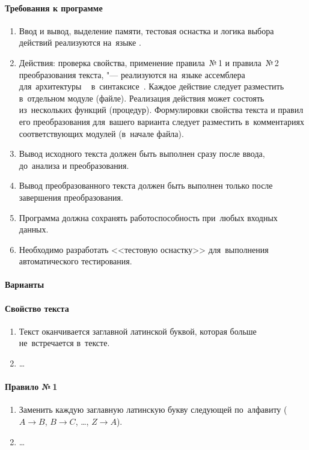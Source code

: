 \documentclass[a4paper,11pt,landscape,notitlepage,oneside,openany,final]{memoir}
\begin{document}
\paragraph{Требования к программе}
\begin{enumerate}
    \item Ввод и вывод, выделение памяти, тестовая оснастка и логика выбора действий реализуются на~языке .
    \item Действия: проверка свойства, применение правила~№\,1 и правила~№\,2 преобразования текста, "--- реализуются на~языке ассемблера для~архитектуры ~ в~синтаксисе~. Каждое действие следует разместить в~отдельном модуле (файле). Реализация действия может состоять из~нескольких функций (процедур). Формулировки свойства текста и правил его преобразования для~вашего варианта следует разместить в~комментариях соответствующих модулей (в~начале файла).
    \item Вывод исходного текста должен быть выполнен сразу после ввода, до~анализа и преобразования.
    \item Вывод преобразованного текста должен быть выполнен только после завершения преобразования.
    \item Программа должна сохранять работоспособность при~любых входных данных.
    \item Необходимо разработать <<тестовую оснастку>> для~выполнения автоматического тестирования.
\end{enumerate}


\paragraph{Варианты}
\paragraph{Свойство текста}
\begin{enumerate}
    \item Текст оканчивается заглавной латинской буквой, которая больше не~встречается в~тексте.
    \item \ldots
\end{enumerate}


\paragraph{Правило №\,1}
\begin{enumerate}
    \item Заменить каждую заглавную латинскую букву следующей по~алфавиту (\(A\rightarrow B\), \(B\rightarrow C\), \ldots, \(Z\rightarrow A\)).
    \item \ldots
\end{enumerate}
\end{document}
